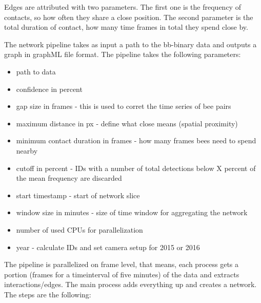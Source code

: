 Edges are attributed with two parameters. The first one is the frequency of contacts, so how often they share a close position. The second parameter is the total duration of contact, how many time frames in total they spend close by.

The network pipeline takes as input a path to the bb-binary data and outputs a graph in graphML file format. The pipeline takes the following parameters:

\begin{itemize}
\item path to data
\item confidence in percent
\item gap size in frames - this is used to corret the time series of bee pairs
\item maximum distance in px - define what close means (spatial proximity)
\item minimum contact duration in frames - how many frames bees need to spend nearby
\item cutoff in percent - IDs with a number of total detections below X percent of the mean frequency are discarded 
\item start timestamp - start of network slice
\item window size in minutes - size of time window for aggregating the network
\item number of used CPUs for parallelization
\item year - calculate IDs and set camera setup for 2015 or 2016
\end{itemize}

The pipeline is parallelized on frame level, that means, each process gets a portion (frames for a timeinterval of five minutes) of the data and extracts interactions/edges. The main process adds everything up and creates a network.
The steps are the following:

